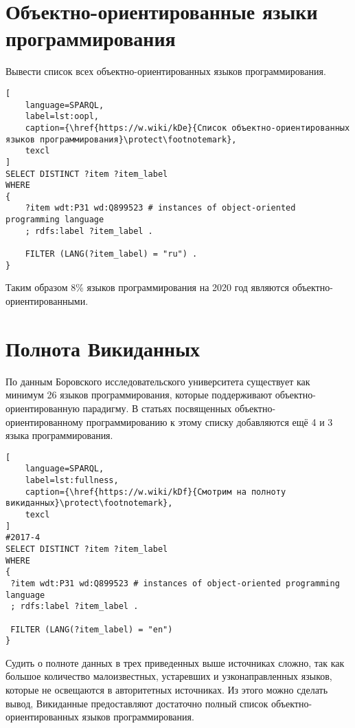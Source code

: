 \section{Объектно-ориентированные языки программирования}
Вывести список всех объектно-ориентированных языков программирования.

\begin{lstlisting}[
	language=SPARQL,
	label=lst:oopl,
	caption={\href{https://w.wiki/kDe}{Список объектно-ориентированных языков программирования}\protect\footnotemark},
	texcl
]
SELECT DISTINCT ?item ?item_label
WHERE
{
    ?item wdt:P31 wd:Q899523 # instances of object-oriented programming language
    ; rdfs:label ?item_label . 

    FILTER (LANG(?item_label) = "ru") . 
}
\end{lstlisting}


Таким образом 8\% языков программирования на 2020 год являются объектно-ориентированными.

\section{Полнота Викиданных}
По данным Боровского исследовательского университета существует как минимум 26 языков программирования, которые поддерживают объектно-ориентированную парадигму. В статьях посвященных объектно-ориентированному программированию к этому списку добавляются ещё 4 и 3 языка программирования. 

\begin{lstlisting}[
	language=SPARQL,
	label=lst:fullness,
	caption={\href{https://w.wiki/kDf}{Смотрим на полноту викиданных}\protect\footnotemark},
	texcl
]
#2017-4
SELECT DISTINCT ?item ?item_label
WHERE
{
 ?item wdt:P31 wd:Q899523 # instances of object-oriented programming language
 ; rdfs:label ?item_label . 

 FILTER (LANG(?item_label) = "en")
}
\end{lstlisting}

Судить о полноте данных в трех приведенных выше источниках сложно, так как большое количество малоизвестных, устаревших и узконаправленных языков, которые не освещаются в авторитетных источниках. Из этого можно сделать вывод, Викиданные предоставляют достаточно полный список объектно-ориентированных языков программирования.


